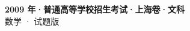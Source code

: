 \documentclass[zihao=-4, a4paper]{ctexart}
\begin{document}
\begin{center}
  {\Large\bfseries 2009 年·普通高等学校招生考试·上海卷·文科}\\[4pt]
  {\large 数学 · 试题版}
\end{center}
\medskip
{}

\end{document}
